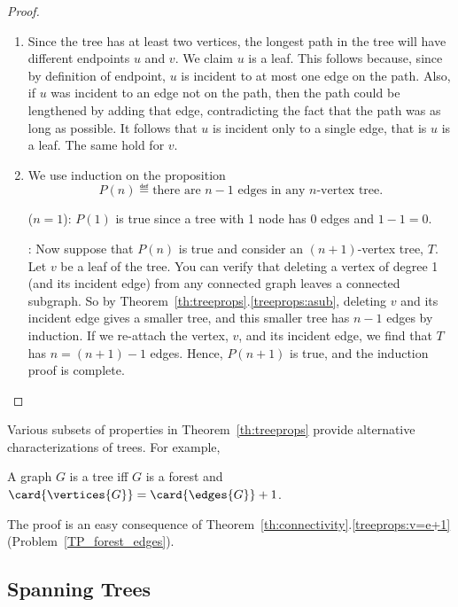\begin{proof}
\begin{enumerate}
\item
  Since the tree has at least two vertices, the longest path in the
  tree will have different endpoints $u$ and $v$.  We claim $u$ is a
  leaf.  This follows because, since by definition of endpoint, $u$ is
  incident to at most one edge on the path.  Also, if $u$ was incident to
  an edge not on the path, then the path could be lengthened by adding
  that edge, contradicting the fact that the path was as long as
  possible.  It follows that $u$ is incident only to a single edge,
  that is $u$ is a leaf.  The same hold for $v$.

\item We use induction on the proposition
\[
P(n) \eqdef \text{there are $n - 1$ edges in any $n$-vertex tree}.
\]

 ($n = 1$): $P(1)$ is true since a tree with
1 node has 0 edges and $1 - 1 = 0$.

: Now suppose that $P(n)$ is true and
consider an $(n+1)$-vertex tree, $T$.  Let $v$ be a leaf of the tree.
You can verify that deleting a vertex of degree 1 (and its incident
edge) from any connected graph leaves a connected subgraph.  So by
Theorem~\ref{th:treeprops}.\ref{treeprops:asub}, deleting $v$ and its
incident edge gives a smaller tree, and this smaller tree has $n - 1$
edges by induction.  If we re-attach the vertex, $v$, and its incident
edge, we find that $T$ has $n = (n + 1) - 1$ edges.  Hence, $P(n + 1)$
is true, and the induction proof is complete.  \qedhere

\end{enumerate}

\end{proof}

Various subsets of properties in Theorem~\ref{th:treeprops} provide
alternative characterizations of trees.  For example,

\begin{lemma}\label{lem:iffe=v-1}
A graph $G$ is a tree iff $G$ is a forest and $\card{\vertices{G}} =
\card{\edges{G}} +1$.
\end{lemma}

The proof is an easy consequence of
Theorem~\ref{th:connectivity}.\ref{treeprops:v=e+1}
(Problem~\ref{TP_forest_edges}).

\subsection{Spanning Trees}\label{spantree_subsec}

